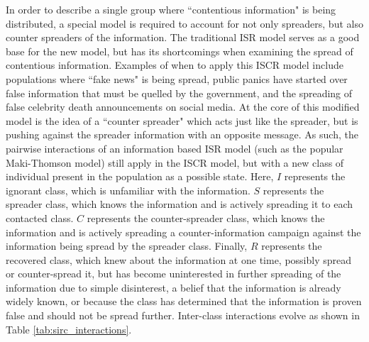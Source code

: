 In order to describe a single group where ``contentious information" is being distributed, a special model is required to account for not only spreaders, but also counter spreaders of the information. The traditional ISR model serves as a good base for the new model, but has its shortcomings when examining the spread of contentious information. Examples of when to apply this ISCR model include populations where ``fake news" is being spread, public panics have started over false information that must be quelled by the government, and the spreading of false celebrity death announcements on social media. At the core of this modified model is the idea of a ``counter spreader" which acts just like the spreader, but is pushing against the spreader information with an opposite message. As such, the pairwise interactions of an information based ISR model (such as the popular Maki-Thomson model) still apply in the ISCR model, but with a new class of individual present in the population as a possible state. Here, $I$ represents the ignorant class, which is unfamiliar with the information. $S$ represents the spreader class, which knows the information and is actively spreading it to each contacted class. $C$ represents the counter-spreader class, which knows the information and is actively spreading a counter-information campaign against the information being spread by the spreader class. Finally, $R$ represents the recovered class, which knew about the information at one time, possibly spread or counter-spread it, but has become uninterested in further spreading of the information due to simple disinterest, a belief that the information is already widely known, or because the class has determined that the information is proven false and should not be spread further. Inter-class interactions evolve as shown in Table \ref{tab:sirc_interactions}.

